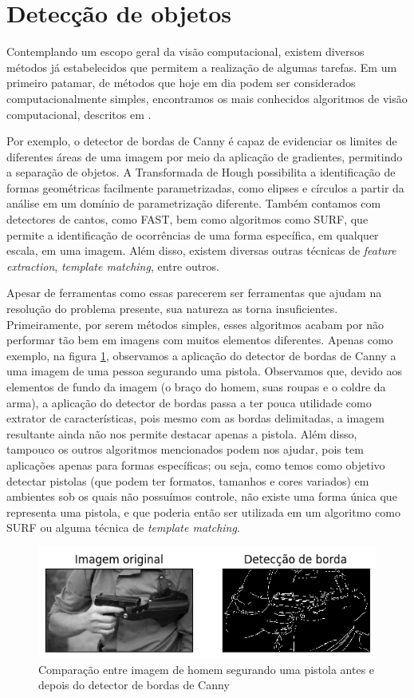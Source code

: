 \documentclass[]{politex}
\begin{document}
\section{Detecção de objetos}

Contemplando um escopo geral da visão computacional, existem diversos métodos já estabelecidos que permitem a realização de algumas tarefas. Em um primeiro patamar, de métodos que hoje em dia podem ser considerados computacionalmente simples, encontramos os mais conhecidos algoritmos de visão computacional, descritos em \citeyear{opencv} \citeauthor{opencv}.

Por exemplo, o detector de bordas de Canny é capaz de evidenciar os limites de diferentes áreas de uma imagem por meio da aplicação de gradientes, permitindo a separação de objetos. A Transformada de Hough possibilita a identificação de formas geométricas facilmente parametrizadas, como elipses e círculos a partir da análise em um domínio de parametrização diferente. Também contamos com detectores de cantos, como  FAST, bem como algoritmos como SURF, que permite a identificação de ocorrências de uma forma específica, em qualquer escala, em uma imagem. Além disso, existem diversas outras técnicas de \textit{feature extraction}, \textit{template matching}, entre outros.

Apesar de ferramentas como essas parecerem ser ferramentas que ajudam na resolução do problema presente, sua natureza as torna insuficientes. Primeiramente, por serem métodos simples, esses algoritmos acabam por não performar tão bem em imagens com muitos elementos diferentes. Apenas como exemplo, na figura \ref{fig:canny}, observamos a aplicação do detector de bordas de Canny a uma imagem de uma pessoa segurando uma pistola. Observamos que, devido aos elementos de fundo da imagem (o braço do homem, suas roupas e o coldre da arma), a aplicação do detector de bordas passa a ter pouca utilidade como extrator de características, pois mesmo com as bordas delimitadas, a imagem resultante ainda não nos permite destacar apenas a pistola. Além disso, tampouco os outros algoritmos mencionados podem nos ajudar, pois tem aplicações apenas para formas específicas; ou seja, como temos como objetivo detectar pistolas (que podem ter formatos, tamanhos e cores variados) em ambientes sob os quais não possuímos controle, não existe uma forma única que representa uma pistola, e que poderia então ser utilizada em um algoritmo como SURF ou alguma técnica de \textit{template matching}.

\begin{figure}[ht]
  \centering
  \includegraphics[scale=0.8]{img/canny.png}
  \caption{Comparação entre imagem de homem segurando uma pistola antes e depois do detector de bordas de Canny}
  \label{fig:canny}
\end{figure}
\end{document}
